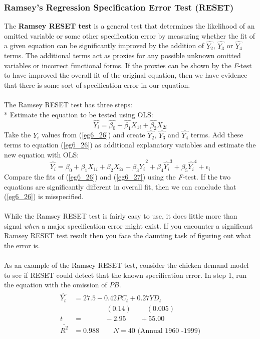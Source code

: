 \documentclass[11pt]{article}
\begin{document}
\subsubsection{Ramsey's Regression Specification Error Test (RESET)}
The \textbf{Ramsey RESET test}  is a general test that determines the likelihood of an omitted variable or some other specification error by measuring whether the fit of a given equation can be significantly improved by the addition of $\hat{Y_2}$, $\hat{Y_3}$ or $\hat{Y_4}$ terms. The additional terms act as proxies for any possible unknown omitted variables or incorrect functional forms. If the proxies can be shown by the \textit{F}-test to have improved the overall fit of the original equation, then we have evidence that there is some sort of specification error in our equation.\\ \\
The Ramsey RESET test has three steps:\\*
Estimate the equation to be tested using OLS:
\begin{equation}
\hat{Y_i} = \hat{\beta_{0}} + \hat{\beta_1}X_{1i} + \hat{\beta_2}X_{2i} \label{eg6_26}
\end{equation}
Take the $\hat{Y}_i$ values from (\ref{eg6_26}) and create $\hat{Y_2}$, $\hat{Y_3}$ and $\hat{Y_4}$ terms. Add these terms to equation (\ref{eg6_26}) as additional explanatory variables and estimate the new equation with OLS:
\begin{equation}
\hat{Y_i} = \beta_{0} + \beta_1X_{1i} + \beta_2X_{2i} + \beta_3\hat{Y_i}^2 + \beta_4\hat{Y_i}^3 + \beta_5\hat{Y_i}^4 + \epsilon_i \label{eg6_27}
\end{equation}
Compare the fits of (\ref{eg6_26}) and (\ref{eg6_27}) using the \textit{F}-test. If the two equations are significantly different in overall fit, then we can conclude that (\ref{eg6_26}) is misspecified.\\ \\
While the Ramsey RESET test is fairly easy to use, it does little more than signal \textit{when} a major specification error might exist. If you encounter a significant Ramsey RESET test result then you face the daunting task of figuring out what the error is.\\ \\
As an example of the Ramsey RESET test, consider the chicken demand model to see if RESET could detect that the known specification error. In step 1, run the equation with the omission of $PB$.
\begin{align*}
\begin{split}
\hat{Y_t} &= 27.5 - {0.42PC_t} + {0.27YD_t}\\
&\>\>\>\>\>\>\>\>\>\>\>\>\>\>\>\>\>\>\>\>\> (0.14) 
\>\>\>\>\>\>\>\>\>\> (0.005)\\
t&=\>\>\>\>\>\>\>\>\>\>\>\>\>\> -2.95 
\>\>\>\>\>\>\>\>\> +55.00\\
\bar{R^2}&= 0.988 \quad\quad N=40 \text{  (Annual 1960 -1999)}
\end{split}
\end{align*}
\end{document}

